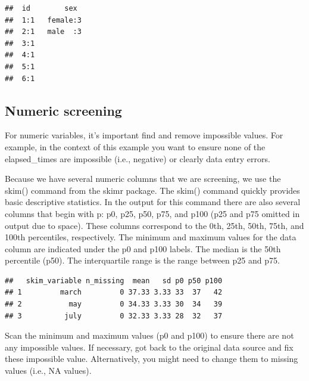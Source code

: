 \documentclass[
]{krantz}
\makeatletter
\newenvironment{Shaded}{\begin{snugshade}}{\end{snugshade}}
\newcommand{\KeywordTok}[1]{\textcolor[rgb]{0.27,0.27,0.27}{\textbf{#1}}}
\newcommand{\NormalTok}[1]{#1}
\newcommand{\OperatorTok}[1]{\textcolor[rgb]{0.43,0.43,0.43}{\textbf{#1}}}
\newcommand{\StringTok}[1]{\textcolor[rgb]{0.5,0.5,0.5}{#1}}
\newenvironment{kframe}{%
\medskip{}
\setlength{\fboxsep}{.8em}
 \def\at@end@of@kframe{}%
 \ifinner\ifhmode%
  \def\at@end@of@kframe{\end{minipage}}%
  \begin{minipage}{\columnwidth}%
 \fi\fi%
 \def\FrameCommand##1{\hskip\@totalleftmargin \hskip-\fboxsep
 \colorbox{shadecolor}{##1}\hskip-\fboxsep
     \hskip-\linewidth \hskip-\@totalleftmargin \hskip\columnwidth}%
 \MakeFramed {\advance\hsize-\width
   \@totalleftmargin\z@ \linewidth\hsize
   \@setminipage}}%
 {\par\unskip\endMakeFramed%
 \at@end@of@kframe}
\renewenvironment{Shaded}{\begin{kframe}}{\end{kframe}}
\makeatother
\begin{document}
\begin{verbatim}
##  id        sex   
##  1:1   female:3  
##  2:1   male  :3  
##  3:1             
##  4:1             
##  5:1             
##  6:1
\end{verbatim}

\hypertarget{numeric-screening-1}{%
\subsection{Numeric screening}\label{numeric-screening-1}}

For numeric variables, it's important find and remove impossible values. For example, in the context of this example you want to ensure none of the elapsed\_times are impossible (i.e., negative) or clearly data entry errors.

Because we have several numeric columns that we are screening, we use the skim() command from the skimr package. The skim() command quickly provides basic descriptive statistics. In the output for this command there are also several columns that begin with p: p0, p25, p50, p75, and p100 (p25 and p75 omitted in output due to space). These columns correspond to the 0th, 25th, 50th, 75th, and 100th percentiles, respectively. The minimum and maximum values for the data column are indicated under the p0 and p100 labels. The median is the 50th percentile (p50). The interquartile range is the range between p25 and p75.

\begin{Shaded}
\end{Shaded}

\begin{verbatim}
##   skim_variable n_missing  mean   sd p0 p50 p100
## 1         march         0 37.33 3.33 33  37   42
## 2           may         0 34.33 3.33 30  34   39
## 3          july         0 32.33 3.33 28  32   37
\end{verbatim}

Scan the minimum and maximum values (p0 and p100) to ensure there are not any impossible values. If necessary, got back to the original data source and fix these impossible value. Alternatively, you might need to change them to missing values (i.e., NA values).
\end{document}
